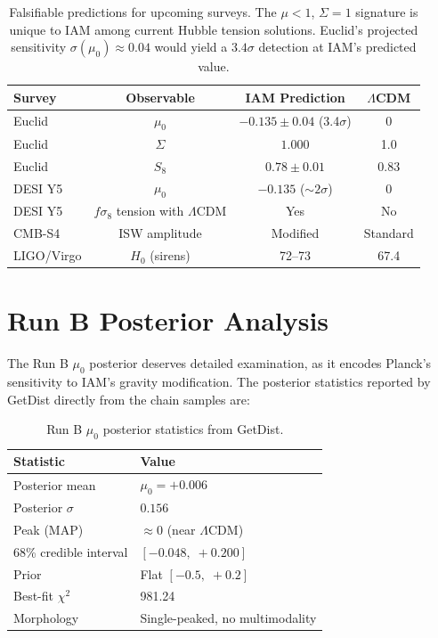 \documentclass[11pt,letterpaper]{article}
\begin{document}
\begin{table}[h]
\centering
\begin{tabular}{lccc}
\toprule
Survey & Observable & IAM Prediction & $\Lambda$CDM \\
\midrule
Euclid & $\mu_0$ & $-0.135 \pm 0.04$ (3.4$\sigma$) & 0 \\
Euclid & $\Sigma$ & $1.000$ & 1.0 \\
Euclid & $S_8$ & $0.78 \pm 0.01$ & 0.83 \\
DESI Y5 & $\mu_0$ & $-0.135$ ($\sim$$2\sigma$) & 0 \\
DESI Y5 & $f\sigma_8$ tension with $\Lambda$CDM & Yes & No \\
CMB-S4 & ISW amplitude & Modified & Standard \\
LIGO/Virgo & $H_0$ (sirens) & 72--73 & 67.4 \\
\bottomrule
\end{tabular}
\caption{Falsifiable predictions for upcoming surveys. The $\mu < 1$, $\Sigma = 1$ signature is unique to IAM among current Hubble tension solutions. Euclid's projected sensitivity $\sigma(\mu_0) \approx 0.04$ would yield a $3.4\sigma$ detection at IAM's predicted value.}
\end{table}

\section{Run B Posterior Analysis}
\label{sec:runB_posterior}

The Run B $\mu_0$ posterior deserves detailed examination, as it encodes Planck's sensitivity to IAM's gravity modification. The posterior statistics reported by GetDist directly from the chain samples are:

\begin{table}[h]
\centering
\begin{tabular}{ll}
\toprule
Statistic & Value \\
\midrule
Posterior mean & $\mu_0 = +0.006$ \\
Posterior $\sigma$ & $0.156$ \\
Peak (MAP) & $\approx 0$ (near $\Lambda$CDM) \\
68\% credible interval & $[-0.048,\; +0.200]$ \\
Prior & Flat $[-0.5,\; +0.2]$ \\
Best-fit $\chi^2$ & 981.24 \\
Morphology & Single-peaked, no multimodality \\
\bottomrule
\end{tabular}
\caption{Run B $\mu_0$ posterior statistics from GetDist.}
\label{tab:runB_posterior}
\end{table}
\end{document}
